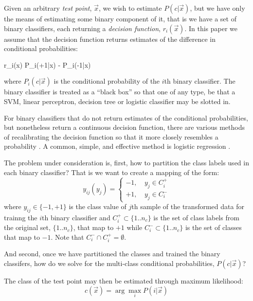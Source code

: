 Given an arbitrary {\it test point}, $\vec x$, 
we wish to estimate $P(c | \vec x)$, but we have only 
the means of estimating some binary component of it, that is we have a 
set of binary classifiers, 
each returning a {\it decision function}, $r_i(\vec x)$.
In this paper we assume that the decision function 
returns estimates of the difference in conditional probabilities:
\begin{eqnnon}
	r_i(\vec x) \approx P_i(+1|\vec x) - P_i(-1|\vec x)
\end{eqnnon}
where $P_i(c|\vec x)$ is the conditional probability of the $i$th
binary classifier.
The binary classifier is treated as a ``black box'' so that one of any type,
be that a SVM, linear perceptron, decision tree or logistic classifier may be 
slotted in.

For binary classifiers that do not return estimates of the conditional
probabilities, but nonetheless return a continuous decision function,
there are various methods of recalibrating the decision function
so that it more closely resembles a probability 
\citep{Zadrozny_Elkan2002,Jolliffe_Stephenson2003,Niculescu_Caruana2005}.
A common, simple, and effective method is logistic regression \citep{Platt1999}.

The problem under consideration is, first,
how to partition the class labels used in each binary classifier?
That is we want to create a mapping of the form:
\begin{equation}
	y_{ij} (y_j) = \left \lbrace  \begin{array}{lr}
-1, & ~ y_j \in C_i^+ \\
+1, & ~ y_j \in C_i^-
\end{array}
	\right . \label{mapping}
\end{equation}
where $y_{ij} \in \lbrace -1, +1 \rbrace$ is the class value of $j$th sample of the transformed data 
for trainng the $i$th binary classifier and 
$C_i^+ \subset \lbrace 1..n_c \rbrace$ is the set of class labels from the original set,
$\lbrace 1..n_c \rbrace$, that map to $+1$ while
$C_i^- \subset \lbrace 1..n_c \rbrace$ is the set of classes that map to $-1$.
Note that $C_i^- \cap C_i^+ = \emptyset$.

And second, once we have partitioned the classes
and trained the binary classifers,
how do we solve for the multi-class conditional probabilities, $P(c|\vec x)$?

The class of the test point may then be estimated through maximum likelihood:
\begin{equation}
	c(\vec x)=\arg \max_i P(i | \vec x)
	\label{maximum_likelihood}
\end{equation}

